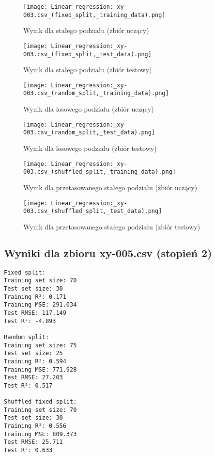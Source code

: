 \documentclass{article}
\begin{document}
\begin{figure}[H]
    \centering
    \begin{minipage}{0.45\textwidth}
        \texttt{[image: Linear\_regression:\_xy-003.csv\_(fixed\_split,\_training\_data).png]}
        \caption{Wynik dla stałego podziału (zbiór uczący)}
    \end{minipage}
    \hfill
    \begin{minipage}{0.45\textwidth}
        \texttt{[image: Linear\_regression:\_xy-003.csv\_(fixed\_split,\_test\_data).png]}
        \caption{Wynik dla stałego podziału (zbiór testowy)}
    \end{minipage}
\end{figure}

\begin{figure}[H]
    \centering
    \begin{minipage}{0.45\textwidth}
        \texttt{[image: Linear\_regression:\_xy-003.csv\_(random\_split,\_training\_data).png]}
        \caption{Wynik dla losowego podziału (zbiór uczący)}
    \end{minipage}
    \hfill
    \begin{minipage}{0.45\textwidth}
        \texttt{[image: Linear\_regression:\_xy-003.csv\_(random\_split,\_test\_data).png]}
        \caption{Wynik dla losowego podziału (zbiór testowy)}
    \end{minipage}
\end{figure}

\begin{figure}[H]
    \centering
    \begin{minipage}{0.45\textwidth}
        \texttt{[image: Linear\_regression:\_xy-003.csv\_(shuffled\_split,\_training\_data).png]}
        \caption{Wynik dla przetasowanego stałego podziału (zbiór uczący)}
    \end{minipage}
    \hfill
    \begin{minipage}{0.45\textwidth}
        \texttt{[image: Linear\_regression:\_xy-003.csv\_(shuffled\_split,\_test\_data).png]}
        \caption{Wynik dla przetasowanego stałego podziału (zbiór testowy)}
    \end{minipage}
\end{figure}

\subsection{Wyniki dla zbioru xy-005.csv (stopień 2)}
\begin{verbatim}
Fixed split:
Training set size: 70
Test set size: 30
Training R²: 0.171
Training MSE: 291.034
Test RMSE: 117.149
Test R²: -4.893

Random split:
Training set size: 75
Test set size: 25
Training R²: 0.594
Training MSE: 771.928
Test RMSE: 27.203
Test R²: 0.517

Shuffled fixed split:
Training set size: 70
Test set size: 30
Training R²: 0.556
Training MSE: 809.373
Test RMSE: 25.711
Test R²: 0.633
\end{verbatim}
\end{document}
